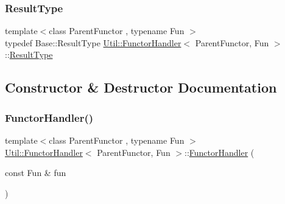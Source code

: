 \mbox{\label{classUtil_1_1FunctorHandler_a036da44b8cc2567704cebd2a20d16c80}} 
\subsubsection{\texorpdfstring{ResultType}{ResultType}\hspace{0.1cm}{\footnotesize\ttfamily [2/2]}}
{\footnotesize\ttfamily template$<$class Parent\+Functor , typename Fun $>$ \\
typedef Base\+::\+Result\+Type \mbox{\hyperlink{classUtil_1_1FunctorHandler}{Util\+::\+Functor\+Handler}}$<$ Parent\+Functor, Fun $>$\+::\mbox{\hyperlink{classUtil_1_1FunctorHandler_a036da44b8cc2567704cebd2a20d16c80}{Result\+Type}}}



\subsection{Constructor \& Destructor Documentation}
\mbox{\label{classUtil_1_1FunctorHandler_aa8b8cd815a79a27be8585210d8dccdb5}} 
\subsubsection{\texorpdfstring{FunctorHandler()}{FunctorHandler()}\hspace{0.1cm}{\footnotesize\ttfamily [1/2]}}
{\footnotesize\ttfamily template$<$class Parent\+Functor , typename Fun $>$ \\
\mbox{\hyperlink{classUtil_1_1FunctorHandler}{Util\+::\+Functor\+Handler}}$<$ Parent\+Functor, Fun $>$\+::\mbox{\hyperlink{classUtil_1_1FunctorHandler}{Functor\+Handler}} (\begin{DoxyParamCaption}\item[{const Fun \&}]{fun }\end{DoxyParamCaption})\hspace{0.3cm}{\ttfamily [inline]}}

